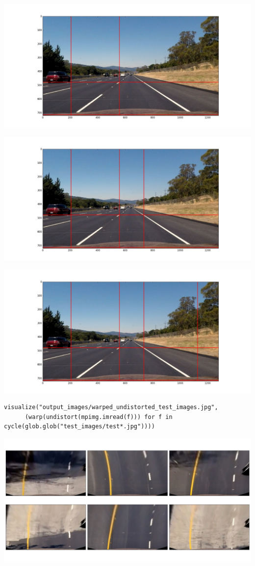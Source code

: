 \documentclass[11pt]{article}
\begin{document}
\includegraphics[width=.9\linewidth]{output_images/figure_3-2.png}

\includegraphics[width=.9\linewidth]{output_images/figure_3-3.png}

\includegraphics[width=.9\linewidth]{output_images/figure_3-4.png}

\begin{verbatim}
visualize("output_images/warped_undistorted_test_images.jpg",
	  (warp(undistort(mpimg.imread(f))) for f in cycle(glob.glob("test_images/test*.jpg"))))
\end{verbatim}

\includegraphics[width=.9\linewidth]{output_images/warped_undistorted_test_images.jpg}
\end{document}
